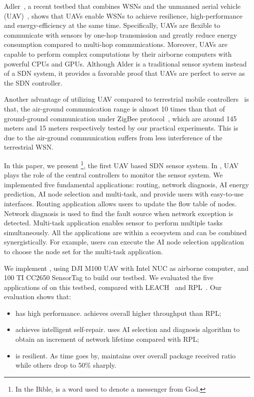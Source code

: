 Adler~\cite{Alder}, a recent testbed that combines WSNs
and the unmanned aerial vehicle (UAV)~\cite{Cambone2005Unmanned, Perry2000Unmanned, Cathcart2014Method},
shows that UAVs enable WSNs to achieve resilience, 
high-performance and energy-efficiency at the same time.
Specifically, UAVs are flexible to 
communicate with sensors by one-hop transmission
and greatly reduce energy consumption compared to multi-hop communications.
Moreover, UAVs are capable to perform complex computations 
by their airborne computers with powerful CPUs and GPUs.
Although Alder is a traditional sensor system instead of a SDN system, 
it provides a favorable proof
that UAVs are perfect to serve as the SDN controller.

Another advantage of utilizing UAV compared to
terrestrial mobile controllers~\cite{Somasundara2007Mobile} is that, the air-ground communication range
is almost 10 times than that of ground-ground communication under ZigBee protocol~\cite{Farahani2008ZigBee}, which are
around 145 meters and 15 meters respectively tested by our practical experiments.
This is due to the air-ground communication suffers from less interference of the terrestrial WSN.

In this paper, we present {\sdn}\footnote{In the Bible, {\sdn} is a word used to denote a messenger from God. }, 
the first UAV based SDN sensor system.
In {\sdn}, UAV plays the role of the central controllers to monitor the sensor system.
We implemented five fundamental applications: routing, network diagnosis, 
AI energy prediction, AI node selection and multi-task,
and provide users with easy-to-use interfaces.
Routing application allows users to update the flow table of nodes.
Network diagnosis is used to find the fault source when network exception is detected.
Multi-task application enables sensor to perform multiple 
tasks simultaneously. All the applications are within a ecosystem
and can be combined synergistically. For example,
users can execute the AI node selection application to choose
the node set for the multi-task application. 


We implement {\sdn}, using DJI M100 UAV with Intel NUC as airborne computer, 
and 100 TI CC2650 SensorTag to build our testbed.
We evaluated the five applications of  {\sdn} on this testbed, 
compared with LEACH~\cite{} and RPL~\cite{}.
Our evaluation shows that:
\begin{itemize}
	\item[1)] {\sdn} has high performance. {\sdn} achieves overall {\simpleTput} higher
		throughput than RPL;
	\item[2)] {\sdn} achieves intelligent  self-repair. {\sdn} uses AI
		selection and diagnosis algorithm to obtain an {\totalLife} increment of network lifetime
		compared with RPL;
	\item[3)] {\sdn} is resilient. As time goes by, {\sdn} maintains over
		{\pktRecvRatio} overall package received ratio while others drop to 50\%
		sharply.
\end{itemize}

